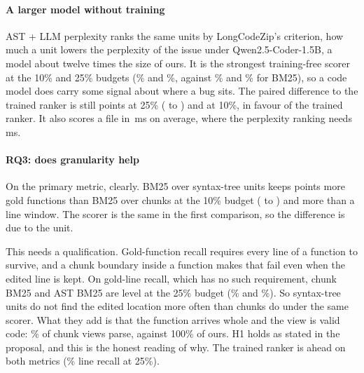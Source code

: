 \paragraph{A larger model without training} AST + LLM perplexity ranks the same units by LongCodeZip's criterion, how much a unit lowers the perplexity of the issue under Qwen2.5-Coder-1.5B, a model about twelve times the size of ours. It is the strongest training-free scorer at the 10\% and 25\% budgets (\% and \%, against \% and \% for BM25), so a code model does carry some signal about where a bug sits. The paired difference to the trained ranker is still  points at 25\% ( to ) and  at 10\%, in favour of the trained ranker. It also scores a file in \,ms on average, where the perplexity ranking needs \,ms.

\paragraph{RQ3: does granularity help} On the primary metric, clearly. BM25 over syntax-tree units keeps  points more gold functions than BM25 over chunks at the 10\% budget ( to ) and  more than a line window. The scorer is the same in the first comparison, so the difference is due to the unit.

This needs a qualification. Gold-function recall requires every line of a function to survive, and a chunk boundary inside a function makes that fail even when the edited line is kept. On gold-line recall, which has no such requirement, chunk BM25 and AST BM25 are level at the 25\% budget (\% and \%). So syntax-tree units do not find the edited location more often than chunks do under the same scorer. What they add is that the function arrives whole and the view is valid code: \% of chunk views parse, against 100\% of ours. H1 holds as stated in the proposal, and this is the honest reading of why. The trained ranker is ahead on both metrics (\% line recall at 25\%).

